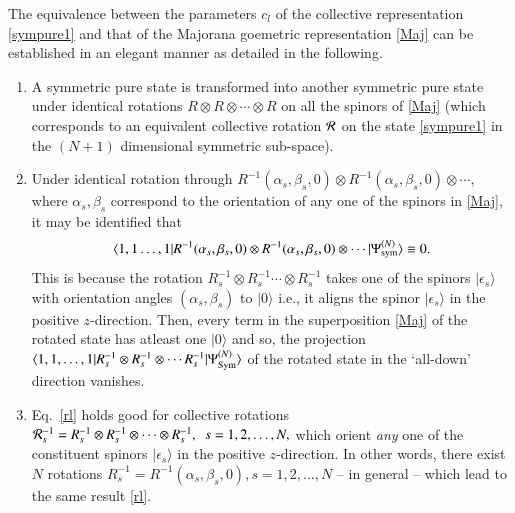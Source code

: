 The equivalence between the parameters $c_l$ of the collective representation \eqref{sympure1} and that of  the Majorana goemetric representation \eqref{Maj} can be established in an elegant manner \cite{usa1,usa2,usa} as detailed in the following. 
\begin{enumerate}
\item A symmetric pure state is transformed into another symmetric pure state under identical rotations $R\otimes R\otimes \cdots \otimes R$ on all the spinors of \eqref{Maj} (which corresponds  to an equivalent collective rotation ${\cal R}$ on the state \eqref{sympure1} in the $(N+1)$ dimensional symmetric sub-space). 

\item Under identical rotation through $R^{-1}(\alpha_s,\beta_s,0)\otimes R^{-1}(\alpha_s,\beta_s,0)\otimes \cdots  $, where $\alpha_s, \beta_s$ correspond to the orientation of any one of the spinors in \eqref{Maj}, it may be identified that 
\begin{equation}
\langle 1,1\ldots , 1\vert R^{-1}(\alpha_s,\beta_s,0)\otimes R^{-1}(\alpha_s,\beta_s,0)\otimes 
\cdots   \vert \Psi^{(N)}_{\rm sym}\rangle\equiv 0.\label{rl}
\end{equation}
This is because the rotation $R_s^{-1}\otimes R_s^{-1}\cdots \otimes R_s^{-1}$ takes one of the spinors $\vert \epsilon_s\rangle$ with orientation angles $(\alpha_s, \beta_s)$ to $\vert 0\rangle$ i.e., it aligns the spinor $\vert \epsilon_s\rangle$ in the positive $z$-direction. Then, every   term in the  superposition \eqref{Maj} of the rotated state has atleast one $\vert 0\rangle$ and so, the projection $\langle 1,1,\ldots, 1\vert R_s^{-1}\otimes R_s^{-1}\otimes \cdots R_s^{-1}\vert \Psi^{(N)}_{\rm Sym}\rangle$ of the rotated state in the `all-down' direction vanishes. 

\item Eq.~\eqref{rl} holds good for  collective rotations ${\cal R}_s^{-1}=R^{-1}_s\otimes R^{-1}_s\otimes\cdots\otimes R^{-1}_s,\ \ s=1,2,\ldots, N,$ which orient {\em any} one of the constituent spinors $\vert\epsilon_s\rangle$ in the positive $z$-direction. In other words, there exist $N$ rotations $R^{-1}_s=R^{-1}(\alpha_s,\beta_s,0), s=1,2,\ldots , N$ -- in general -- which lead to the same result  \eqref{rl}.


\end{enumerate}
